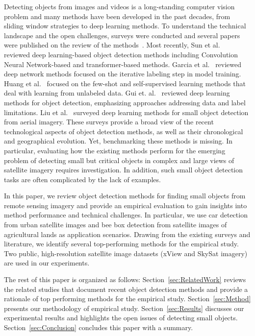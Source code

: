 \documentclass{article}
\begin{document}
Detecting objects from images and videos is a long-standing computer vision problem and many methods have been developed in the past decades, from sliding window strategies to deep learning methods. To understand the technical landscape and the open challenges, surveys were conducted and several papers were published on the review of the methods~\cite{2019Zou, 2023Amjoub}. Most recently, Sun et al.~\cite{2024Sun} reviewed deep learning-based object detection methods including Convolution Neural Network-based and transformer-based methods. Garcia et al.~\cite{2023Garcia} reviewed deep network methods focused on the iterative labeling step in model training. Huang et al.~\cite{2023Huang} focused on the few-shot and self-supervised learning methods that deal with learning from unlabeled data. Gui et. al.~\cite{2024Gui} reviewed deep learning methods for object detection, emphasizing approaches addressing data and label limitations. Liu et al.~\cite{2021Liu} surveyed deep learning methods for small object detection from aerial imagery. 
These surveys provide a broad view of the recent technological aspects of object detection methods, as well as their chronological and geographical evolution. Yet, benchmarking these methods is missing. In particular, evaluating how the existing methods perform for the emerging problem of detecting small but critical objects in complex and large views of satellite imagery requires investigation. In addition, such small object detection tasks are often complicated by the lack of examples. 

In this paper, we review object detection methods for finding small objects from remote sensing imagery and provide an empirical evaluation to gain insights into method performance and technical challenges. In particular, we use car detection from urban satellite images and bee box detection from satellite images of agricultural lands as application scenarios. Drawing from the existing surveys and literature, we identify several top-performing methods for the empirical study. Two public, high-resolution satellite image datasets (xView and SkySat imagery) are used in our experiments. 

The rest of this paper is organized as follows:
Section~\ref{sec:RelatedWork} reviews the related studies that document recent object detection methods and provide a rationale of top performing methods for the empirical study. 
Section~\ref{sec:Method} presents our methodology of empirical study. 
Section~\ref{sec:Results} discusses our experimental results and highlights the open issues of detecting small objects. 
Section~\ref{sec:Conclusion} concludes this paper with a summary. 
\end{document}
